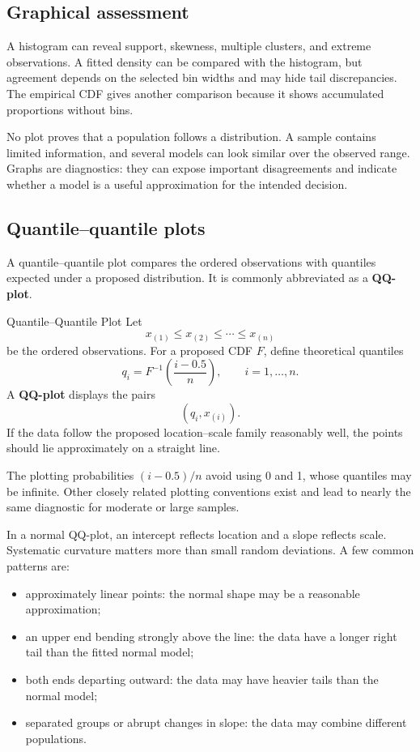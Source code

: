\subsection{Graphical assessment}

A histogram can reveal support, skewness, multiple clusters, and extreme observations. A fitted density can be compared with the histogram, but agreement depends on the selected bin widths and may hide tail discrepancies. The empirical CDF gives another comparison because it shows accumulated proportions without bins.

No plot proves that a population follows a distribution. A sample contains limited information, and several models can look similar over the observed range. Graphs are diagnostics: they can expose important disagreements and indicate whether a model is a useful approximation for the intended decision.

\subsection{Quantile--quantile plots}

A quantile--quantile plot compares the ordered observations with quantiles expected under a proposed distribution. It is commonly abbreviated as a \textbf{QQ-plot}.

\begin{definition}{Quantile--Quantile Plot}
Let
\[
    x_{(1)}\leq x_{(2)}\leq\cdots\leq x_{(n)}
\]
be the ordered observations. For a proposed CDF $F$, define theoretical quantiles
\[
    q_i=F^{-1}\!\left(\frac{i-0.5}{n}\right),
    \qquad i=1,\ldots,n.
\]
A \textbf{QQ-plot} displays the pairs
\[
    (q_i,x_{(i)}).
\]
If the data follow the proposed location--scale family reasonably well, the points should lie approximately on a straight line.
\end{definition}

The plotting probabilities $(i-0.5)/n$ avoid using 0 and 1, whose quantiles may be infinite. Other closely related plotting conventions exist and lead to nearly the same diagnostic for moderate or large samples.

In a normal QQ-plot, an intercept reflects location and a slope reflects scale. Systematic curvature matters more than small random deviations. A few common patterns are:

\begin{itemize}
    \item approximately linear points: the normal shape may be a reasonable approximation;
    \item an upper end bending strongly above the line: the data have a longer right tail than the fitted normal model;
    \item both ends departing outward: the data may have heavier tails than the normal model;
    \item separated groups or abrupt changes in slope: the data may combine different populations.
\end{itemize}

